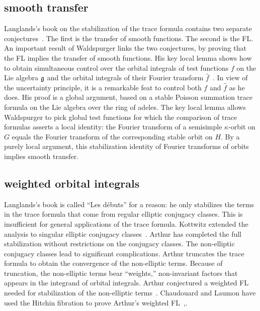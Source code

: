 \documentclass[brochure,english,12pt]{bourbaki}
\def\g{\frak{g}}
\begin{document}
\subsection{smooth transfer}

Langlands's book on the stabilization of the trace formula contains
two separate conjectures~\cite{Langlands:debuts}.  The first is the transfer of smooth
functions.  The second is the FL.  An important result
of Waldspurger links the two conjectures, by proving that the
FL implies the transfer of smooth functions.  
His key local lemma shows how to obtain simultaneous control over the
orbital integrals of test functions $f$ on the Lie algebra $\g$ and the orbital integrals of
their Fourier transform $\hat f$~\cite[Prop.~8.2]{Wald:transfert}.  
In view of the uncertainty principle, it is a remarkable feat to
control both $f$ and $\hat f$ as he does.
His proof is a global argument, based on a stable Poisson summation
trace formula on the Lie algebra over the ring of adeles.  The key local lemma allows
Waldspurger to pick global test functions for which the comparison of
trace formulas asserts a local identity: the Fourier transform of a
semisimple $\kappa$-orbit on $G$ equals the Fourier transform of the
corresponding stable orbit on $H$.  By a purely local argument, this
stabilization identity of Fourier transforms of orbits implies smooth transfer.


\subsection{weighted orbital integrals}

Langlands's book is called ``Les d\'ebuts'' for a reason: he only
stabilizes the terms in the trace formula that come from regular
elliptic conjugacy classes.  This is insufficient for general
applications of the trace formula.  Kottwitz extended the analysis to
singular elliptic conjugacy classes~\cite{Kott:singular}.  Arthur has
completed the full stabilization without restrictions on the conjugacy
classes.  The non-elliptic conjugacy classes lead to significant
complications.  Arthur truncates the trace formula to obtain the
convergence of the non-elliptic terms.  Because of truncation, the
non-elliptic terms bear ``weights,'' non-invariant factors that
appears in the integrand of orbital integrals.  Arthur conjectured a
weighted FL needed for stabilization of the non-elliptic
terms~\cite{Arthur:2002}.  Chaudouard and Laumon have used the Hitchin
fibration to prove Arthur's weighted
FL~\cite{CL:2009:I},\cite{CL:2009:II}.
\end{document}
